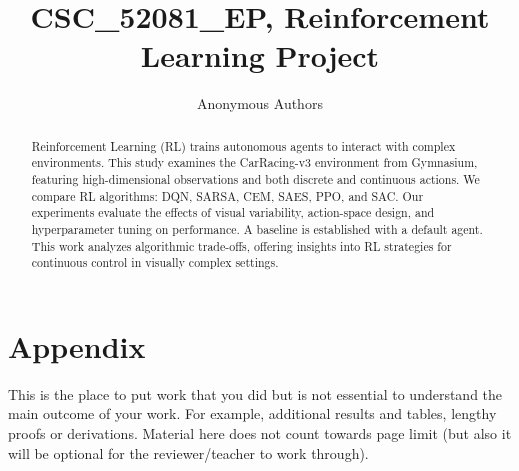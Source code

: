 \documentclass[journal, a4paper]{IEEEtran}
\begin{document}
\title{CSC\_52081\_EP, Reinforcement Learning Project}
\author{Anonymous Authors}
\maketitle

\begin{abstract}
    Reinforcement Learning (RL) trains autonomous agents to interact with complex environments. This study examines the CarRacing-v3 environment from Gymnasium, featuring high-dimensional observations and both discrete and continuous actions. We compare RL algorithms: DQN, SARSA, CEM, SAES, PPO, and SAC. Our experiments evaluate the effects of visual variability, action-space design, and hyperparameter tuning on performance. A baseline is established with a default agent. This work analyzes algorithmic trade-offs, offering insights into RL strategies for continuous control in visually complex settings.
\end{abstract}







\newpage
\section*{Appendix}
This is the place to put work that you did but is not essential to understand the main outcome of your work. For example, additional results and tables, lengthy proofs or derivations. Material here does not count towards page limit (but also it will be optional for the reviewer/teacher to work through). 
\end{document}

